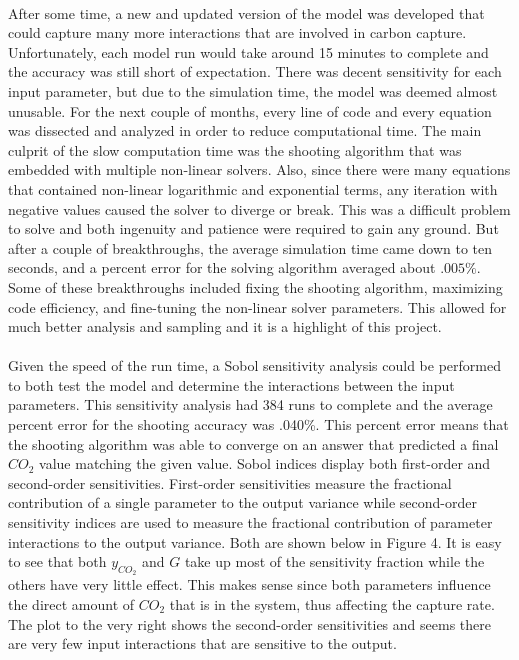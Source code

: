 \documentclass[12pt, letterpaper]{article}
\begin{document}
\paragraph{}
After some time, a new and updated version of the model was developed that could capture many more interactions that are involved in carbon capture. Unfortunately, each model run would take around 15 minutes to complete and the accuracy was still short of expectation. There was decent sensitivity for each input parameter, but due to the simulation time, the model was deemed almost unusable. For the next couple of months, every line of code and every equation was dissected and analyzed in order to reduce computational time.  The main culprit of the slow computation time was the shooting algorithm that was embedded with multiple non-linear solvers. Also, since there were many equations that contained non-linear logarithmic and exponential terms, any iteration with negative values caused the solver to diverge or break. This was a difficult problem to solve and both ingenuity and patience were required to gain any ground.  But after a couple of breakthroughs, the average simulation time came down to ten seconds, and a percent error for the solving algorithm averaged about $.005\% $. Some of these breakthroughs included fixing the shooting algorithm, maximizing code efficiency, and fine-tuning the non-linear solver parameters. This allowed for much better analysis and sampling and it is a highlight of this project. 

\paragraph{}
Given the speed of the run time, a Sobol sensitivity analysis could be performed to both test the model and determine the interactions between the input parameters. This sensitivity analysis had 384 runs to complete and the average percent error for the shooting accuracy was .040\%.  This percent error means that the shooting algorithm was able to converge on an answer that predicted a final $CO_2$ value matching the given value. Sobol indices display both first-order and second-order sensitivities. First-order sensitivities measure the fractional contribution of a single parameter to the output variance while second-order sensitivity indices are used to measure the fractional contribution of parameter interactions to the output variance. Both are shown below in Figure 4. It is easy to see that both $y_{CO_2}$ and $G$ take up most of the sensitivity fraction while the others have very little effect. This makes sense since both parameters influence the direct amount of $CO_2$ that is in the system, thus affecting the capture rate. The plot to the very right shows the second-order sensitivities and seems there are very few input interactions that are sensitive to the output.
\end{document}
